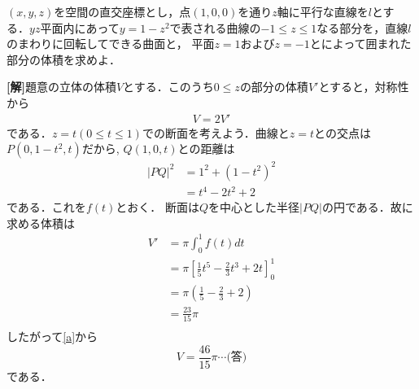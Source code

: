 \documentclass[a4j]{jarticle}
\begin{document}

\begin{oframed}
$(x,y,z)$を空間の直交座標とし，点$(1,0,0)$を通り$z$軸に平行な直線を$l$とする．$yz$平面内にあって$y=1-z^2$で表される曲線の$-1\le z\le 1$なる部分を，直線$l$のまわりに回転してできる曲面と，
平面$z=1$および$z=-1$とによって囲まれた部分の体積を求めよ．
\end{oframed}

\setlength{\columnseprule}{0.4pt}
\begin{multicols}{2}
{\bf[解]}題意の立体の体積$V$とする．このうち$0\le z$の部分の体積$V'$とすると，対称性から
     \begin{align}
     V=2V' \label{a}
     \end{align}
である．$z=t(0\le t\le 1)$での断面を考えよう．曲線と$z=t$との交点は$P(0,1-t^2,t)$だから,
$Q(1,0,t)$との距離は
     \begin{align*}
     |PQ|^2&=1^2+(1-t^2)^2 \\
     &=t^4-2t^2+2
     \end{align*}
である．これを$f(t)$とおく．
断面は$Q$を中心とした半径$|PQ|$の円である．故に求める体積は
     \begin{align*}
     V'&=\pi\int_0^1f(t)dt \\
     &=\pi\left[\frac{1}{5}t^5-\frac{2}{3}t^3+2t\right]_0^1 \\
     &=\pi\left(\frac{1}{5}-\frac{2}{3}+2\right) \\
     &=\frac{23}{15}\pi \\
     \end{align*}
したがって\eqref{a}から
\[V=\frac{46}{15}\pi\cdots\text{(答)}　\]
である．
\newpage
\end{multicols}
\end{document}
